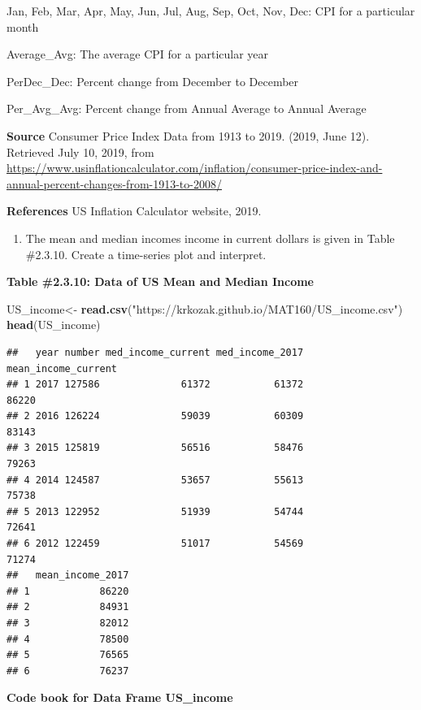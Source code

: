 \documentclass[]{book}
\newenvironment{Shaded}{\begin{snugshade}}{\end{snugshade}}
\newcommand{\KeywordTok}[1]{\textcolor[rgb]{0.13,0.29,0.53}{\textbf{#1}}}
\newcommand{\NormalTok}[1]{#1}
\newcommand{\StringTok}[1]{\textcolor[rgb]{0.31,0.60,0.02}{#1}}
\providecommand{\tightlist}{%
  \setlength{\itemsep}{0pt}\setlength{\parskip}{0pt}}
\begin{document}
Jan, Feb, Mar, Apr, May, Jun, Jul, Aug, Sep, Oct, Nov, Dec: CPI for a particular month

Average\_Avg: The average CPI for a particular year

PerDec\_Dec: Percent change from December to December

Per\_Avg\_Avg: Percent change from Annual Average to Annual Average

\textbf{Source}
Consumer Price Index Data from 1913 to 2019. (2019, June 12). Retrieved July 10, 2019, from \url{https://www.usinflationcalculator.com/inflation/consumer-price-index-and-annual-percent-changes-from-1913-to-2008/}

\textbf{References}
US Inflation Calculator website, 2019.

\begin{enumerate}
\def\labelenumi{\arabic{enumi}.}
\setcounter{enumi}{7}
\tightlist
\item
  The mean and median incomes income in current dollars is given in Table \#2.3.10. Create a time-series plot and interpret.
\end{enumerate}

\textbf{Table \#2.3.10: Data of US Mean and Median Income}

\begin{Shaded}
\begin{Highlighting}[]
\NormalTok{US_income<-}\StringTok{ }\KeywordTok{read.csv}\NormalTok{(}\StringTok{"https://krkozak.github.io/MAT160/US_income.csv"}\NormalTok{)}
\KeywordTok{head}\NormalTok{(US_income)}
\end{Highlighting}
\end{Shaded}

\begin{verbatim}
##   year number med_income_current med_income_2017 mean_income_current
## 1 2017 127586              61372           61372               86220
## 2 2016 126224              59039           60309               83143
## 3 2015 125819              56516           58476               79263
## 4 2014 124587              53657           55613               75738
## 5 2013 122952              51939           54744               72641
## 6 2012 122459              51017           54569               71274
##   mean_income_2017
## 1            86220
## 2            84931
## 3            82012
## 4            78500
## 5            76565
## 6            76237
\end{verbatim}

\textbf{Code book for Data Frame US\_income}
\end{document}
